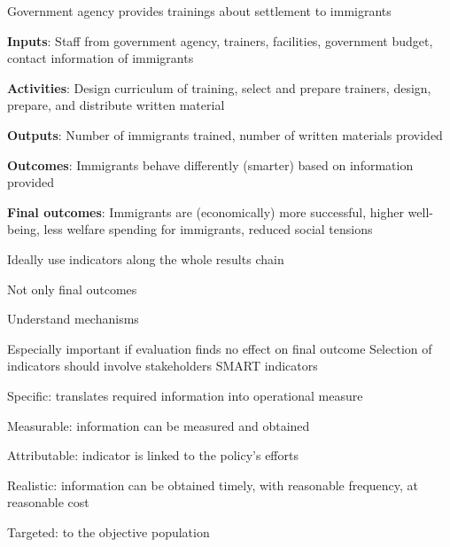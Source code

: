 \documentclass[
  25pt,         %
  a4paper,
  landscape,
  Screen4to3,
  footrule ]{foils}
\newcommand{\xx}{\item[{\small $\bullet$}]}
\begin{document}
\begin{small}

\bi 
\x Government agency provides trainings about settlement to immigrants
\bi 
\xx {\textbf{Inputs}}: Staff from government agency, trainers, facilities, government budget, contact information of immigrants
\xx {\textbf{Activities}}: Design curriculum of training, select and prepare trainers, design, prepare, and distribute written material
\xx {\textbf{Outputs}}: Number of immigrants trained, number of written materials provided
\xx {\textbf{Outcomes}}: Immigrants behave differently (smarter) based on information provided
\xx {\textbf{Final outcomes}}: Immigrants are (economically) more successful, higher well-being, less welfare spending for immigrants, reduced social tensions
\ei
\ei
\end{small}


{\small
\bi 
\vspace{-1em}
\x Ideally use indicators along the whole results chain
\bi 
\xx Not only final outcomes
\xx Understand mechanisms
\xx Especially important if evaluation finds no effect on final outcome
\ei
\x Selection of indicators should involve stakeholders
\x SMART indicators 
\bi 

\xx Specific: translates required information into operational measure
\xx Measurable: information can be measured and obtained
\xx Attributable: indicator is linked to the policy's efforts
\xx Realistic: information can be obtained timely, with reasonable frequency, at reasonable cost
\xx Targeted: to the objective population 
\ei
\ei
}
\end{document}
